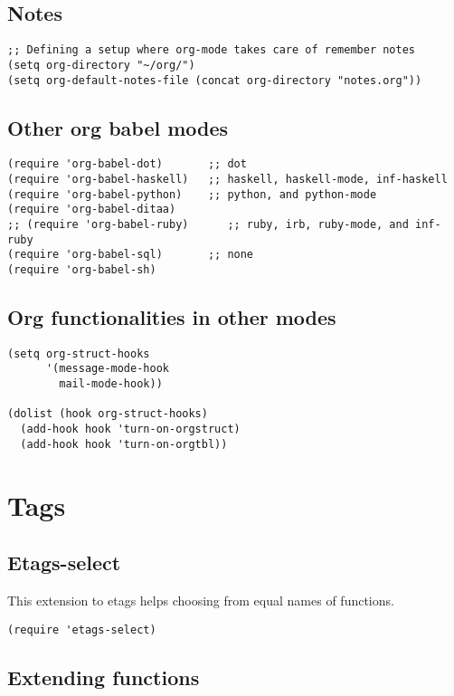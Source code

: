 \documentclass[11pt]{article}
\begin{document}
\subsection{Notes}
\label{sec-24.8}

\begin{verbatim}
;; Defining a setup where org-mode takes care of remember notes
(setq org-directory "~/org/")
(setq org-default-notes-file (concat org-directory "notes.org"))
\end{verbatim}
\subsection{Other org babel modes}
\label{sec-24.9}

\begin{verbatim}
(require 'org-babel-dot)       ;; dot
(require 'org-babel-haskell)   ;; haskell, haskell-mode, inf-haskell
(require 'org-babel-python)    ;; python, and python-mode
(require 'org-babel-ditaa)
;; (require 'org-babel-ruby)      ;; ruby, irb, ruby-mode, and inf-ruby
(require 'org-babel-sql)       ;; none
(require 'org-babel-sh)
\end{verbatim}
\subsection{Org functionalities in other modes}
\label{sec-24.10}

\begin{verbatim}
(setq org-struct-hooks
      '(message-mode-hook
        mail-mode-hook))

(dolist (hook org-struct-hooks)
  (add-hook hook 'turn-on-orgstruct)
  (add-hook hook 'turn-on-orgtbl))
\end{verbatim}
\section{Tags}
\label{sec-25}
\subsection{Etags-select}
\label{sec-25.1}

   This extension to etags helps choosing from equal names of functions.
\begin{verbatim}
(require 'etags-select)
\end{verbatim}
\subsection{Extending functions}
\label{sec-25.2}
\end{document}
